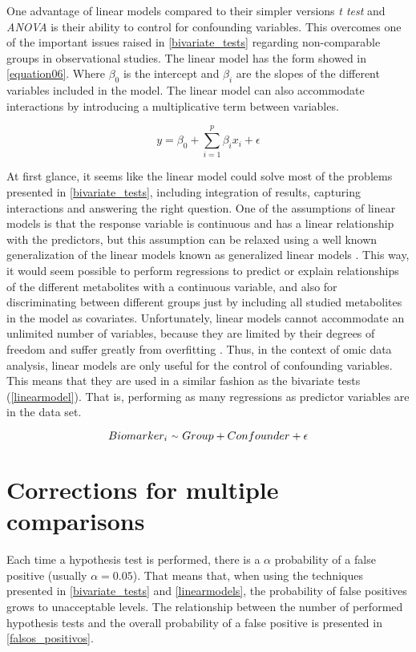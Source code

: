 One advantage of linear models compared to their simpler versions \textit{t test} and \textit{ANOVA} is their ability to control for confounding variables. This overcomes one of the important issues raised in \autoref{bivariate_tests} regarding non-comparable groups in observational studies. The linear model has the form showed in \autoref{equation06}. Where $\beta_0$ is the intercept and $\beta_i$ are the slopes of the different variables included in the model. The linear model can also accommodate interactions by introducing a multiplicative term between variables.

\begin{equation}
\label{equation06}
y=\beta_0 + \sum_{i=1}^{p}\beta_i x_i + \epsilon
\end{equation}

At first glance, it seems like the linear model could solve most of the problems presented in \autoref{bivariate_tests}, including integration of results, capturing interactions and answering the right question. One of the assumptions of linear models is that the response variable is continuous and has a linear relationship with the predictors, but this assumption can be relaxed using a well known generalization of the linear models known as generalized linear models \parencite{mcculloch2000generalized}. This way, it would seem possible to perform regressions to predict or explain relationships of the different metabolites with a continuous variable, and also for discriminating between different groups just by including all studied metabolites in the model as covariates. Unfortunately, linear models cannot accommodate an unlimited number of variables, because they are limited by their degrees of freedom and suffer greatly from overfitting \parencite{babyak2004you, hawkins2004problem}. Thus, in the context of omic data analysis, linear models are only useful for the control of confounding variables. This means that they are used in a similar fashion as the bivariate tests (\autoref{linearmodel}). That is, performing as many regressions as predictor variables are in the data set.

\begin{equation}
\label{linearmodel}
Biomarker_i\ {\raise.17ex\hbox{$\scriptstyle\sim$}}\ Group + Confounder + \epsilon
\end{equation}


\section{Corrections for multiple comparisons}
Each time a hypothesis test is performed, there is a $\alpha$ probability of a false positive (usually $\alpha = 0.05$). That means that, when using the techniques presented in \autoref{bivariate_tests} and \autoref{linearmodels}, the probability of false positives grows to unacceptable levels. The relationship between the number of performed hypothesis tests and the overall probability of a false positive is presented in \autoref{falsos_positivos}.

